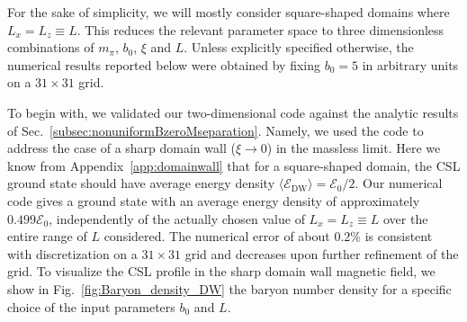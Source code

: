 \documentclass[pdflatex,iicol,sn-mathphys-num]{sn-jnl}
\newcommand{\Ea}{\mathscr{E}}%
\newcommand{\bmag}{b}%
\begin{document}
For the sake of simplicity, we will mostly consider square-shaped domains where $L_x=L_z\equiv L$. This reduces the relevant parameter space to three dimensionless combinations of $m_\pi$, $\bmag_0$, $\xi$ and $L$.  Unless explicitly specified otherwise, the numerical results reported below were obtained by fixing $\bmag_0=5$ in arbitrary units on a $31\times31$ grid.

To begin with, we validated our two-dimensional code against the analytic results of Sec.~\ref{subsec:nonuniformBzeroMseparation}. Namely, we used the code to address the case of a sharp domain wall ($\xi\to0$) in the massless limit. Here we know from Appendix~\ref{app:domainwall} that for a square-shaped domain, the CSL ground state should have average energy density $\langle\Ea_\text{DW}\rangle=\Ea_0/2$. Our numerical code gives a ground state with an average energy density of approximately $0.499\Ea_0$, independently of the actually chosen value of $L_x=L_z\equiv L$ over the entire range of $L$ considered. The numerical error of about $0.2\%$ is consistent with discretization on a $31\times31$ grid and decreases upon further refinement of the grid. To visualize the CSL profile in the sharp domain wall magnetic field, we show in Fig.~\ref{fig:Baryon_density_DW} the baryon number density for a specific choice of the input parameters $\bmag_0$ and $L$.
\end{document}
